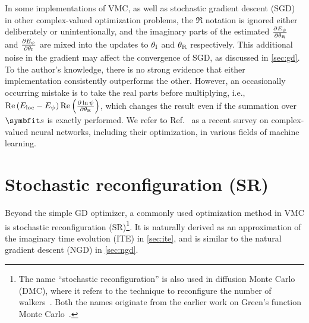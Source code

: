 In some implementations of VMC, as well as stochastic gradient descent (SGD) in other complex-valued optimization problems, the $\Re$ notation is ignored either deliberately or unintentionally, and the imaginary parts of the estimated $\frac{\partial E_\psi}{\partial {\theta_\text{R}}}$ and $\frac{\partial E_\psi}{\partial {\theta_\text{I}}}$ are mixed into the updates to ${\theta_\text{I}}$ and ${\theta_\text{R}}$ respectively. This additional noise in the gradient may affect the convergence of SGD, as discussed in \cref{sec:gd}. To the author's knowledge, there is no strong evidence that either implementation consistently outperforms the other. However, an occasionally occurring mistake is to take the real parts before multiplying, i.e., $\Re\left( E_\text{loc} - E_\psi \right) \Re\left( \frac{\partial \ln \psi}{\partial {\theta_\text{R}}} \right)$, which changes the result even if the summation over $\vs$ is exactly performed. We refer to Ref.~\cite{bassey2021survey} as a recent survey on complex-valued neural networks, including their optimization, in various fields of machine learning.

\section{Stochastic reconfiguration (SR)}
\label{sec:sr}

Beyond the simple GD optimizer, a commonly used optimization method in VMC is stochastic reconfiguration (SR)\footnote{The name ``stochastic reconfiguration'' is also used in diffusion Monte Carlo (DMC), where it refers to the technique to reconfigure the number of walkers~\cite{assaraf2000diffusion}. Both the names originate from the earlier work on Green's function Monte Carlo~\cite{sorella1998green}.}. It is naturally derived as an approximation of the imaginary time evolution (ITE) in \cref{sec:ite}, and is similar to the natural gradient descent (NGD) in \cref{sec:ngd}.

